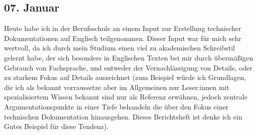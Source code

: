 \subsection{07. Januar}
Heute habe ich in der Berufsschule an einem Input zur Erstellung technischer Dokumentationen auf Englisch teilgenommen. Dieser Input war für mich sehr wertvoll, da ich durch mein Studium einen viel zu akademischen Schreibstil gelernt habe, der sich besonders in Englischen Texten bei mir durch übermäßigen Gebrauch von Fachsprache, und entweder der Vernachlässigung von Details, oder zu starkem Fokus auf Details auszeichnet (zum Beispiel würde ich Grundlagen, die ich als bekannt vorraussetze aber im Allgemeinen nur Leser:innen mit spezialisiertem Wissen bekannt sind nur als Referenz erwähnen, jedoch zentrale Argumentationspunkte in einer Tiefe behandeln die über den Fokus einer technischen Dokumentation hinausgehen. Dieses Berichtsheft ist denke ich ein Gutes Beispiel für diese Tendenz).